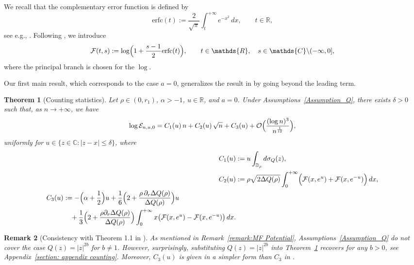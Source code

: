 \documentclass[reqno]{amsart}
\newcommand{\1}{\mathds{1}}
\newcommand{\C}{\mathds{C}}
\newcommand{\R}{\mathds{R}}
\numberwithin{equation}{section}
\newtheorem{theorem}{Theorem}[section]
\newtheorem{remark}[theorem]{Remark}
\theoremstyle{definition}
\begin{document}
\medskip
We recall that the complementary error function is defined by
\begin{equation}
\mathrm{erfc}(t):=\frac{2}{\sqrt{\pi}}\int_t^{+\infty}e^{-x^2}\,dx, \qquad t\in\R,     
\end{equation}
see e.g., \cite[Eq. (7.2.1)]{NIST}. 
Following \cite[Eq. (1.6)]{C2021 FH}, we introduce 
\begin{equation}
\label{def of mathcalFts}
\mathcal{F}(t,s):=\log\Bigl(1+\frac{s-1}{2}\mathrm{erfc}(t)\Bigr),    \qquad
t\in  \R, \quad s \in \C\backslash (-\infty, 0],
\end{equation}
where the principal branch is chosen for the $\log$. 


Our first main result, which corresponds to the case $a=0$, generalizes the result in \cite[Proposition~2.13]{ABES2023} by going beyond the leading term.  
\begin{theorem}[Counting statistics]
\label{theorem:asymptotic expansion of counting statistics}
Let $\rho\in(0,r_1)$, $\alpha>-1$, $u\in\R$, and $a=0$. 
Under Assumptions~\ref{Assumption_Q}, there exists $\delta>0$ such that, as $n\to+\infty$, we have   
\begin{equation}
\label{def of calEnu0 asymptotics}
\log\mathcal{E}_{n,u,0}
=C_1(u)\,n+C_2(u)\,\sqrt{n}+C_3(u)+\mathcal{O}\Bigl(\frac{(\log n)^3}{n^{\frac{1}{12}}}\Bigr),
\end{equation}  
uniformly for $u\in\{z\in\C:|z-x|\leq\delta\}$, where 
\begin{align}
\label{def of C1u disk count}
C_1(u)&:=
u\int_{\mathbb{D}_{\rho}}d\sigma_Q(z), 
\\
\label{def of C2u disk count}
C_2(u)&:=
\rho\sqrt{2\Delta Q(\rho)}\int_{0}^{+\infty}
\Bigl(
\mathcal{F}(x,e^{u})
+
\mathcal{F}(x,e^{-u})
\Bigr)\,dx,
\\
\begin{split}
\label{def of C3u disk count}
C_3(u)&:=
-
\Bigl(\alpha+\frac{1}{2}\Bigr)u
+\frac{1}{6}\Bigl(2+\frac{\rho\,\partial_r\Delta Q(\rho)}{\Delta Q(\rho)}\Bigr)u
\\
&\quad 
+\frac{1}{3}\Bigl(2+\frac{\rho\partial_r\Delta Q(\rho)}{\Delta Q(\rho)}\Bigr)
\int_{0}^{+\infty}
x\bigl(
\mathcal{F}(x,e^{u})
-
\mathcal{F}(x,e^{-u})
\bigr)\,dx.  
\end{split}
\end{align}
\end{theorem}



\begin{remark}[Consistency with Theorem 1.1 in \cite{C2021 FH}]
\label{remark:counting statistics}
As mentioned in Remark~\ref{remark:MF Potential}, Assumptions~\ref{Assumption_Q} do not cover the case $Q(z)=|z|^{2b}$ for $b\neq1$. However, surprisingly, 
substituting $Q(z)=|z|^{2b}$ into Theorem~\ref{theorem:asymptotic expansion of counting statistics} recovers \cite[Theorem~1.1]{BC2022} for any $b>0$, see Appendix~\ref{section: appendix counting}. 
Moreover, $C_3(u)$ is given in a simpler form than $C_3$ in \cite[Theorem 1.1]{C2021 FH}.
\end{remark}
\end{document}
